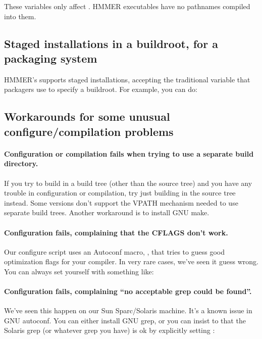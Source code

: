 These variables only affect . HMMER executables
have no pathnames compiled into them.

\subsection{Staged installations in a buildroot, for a packaging system}

HMMER's  supports staged installations, accepting
the traditional  variable that packagers use to specify
a buildroot. For example, you can do:






\subsection{Workarounds for some unusual configure/compilation problems}

\paragraph{Configuration or compilation fails when trying to use a
  separate build directory.}  If you try to build in a build tree
(other than the source tree) and you have any trouble in configuration
or compilation, try just building in the source tree instead. Some
 versions don't support the VPATH mechanism needed to use
separate build trees. Another workaround is to install GNU make.

\paragraph{Configuration fails, complaining that the CFLAGS don't
  work.} Our configure script uses an Autoconf macro,
  , that tries to guess good optimization flags
  for your compiler. In very rare cases, we've seen it guess wrong.
  You can always set  yourself with something like:


\paragraph{Configuration fails, complaining ``no acceptable grep could
  be found''.} We've seen this happen on our Sun Sparc/Solaris
machine. It's a known issue in GNU autoconf. You can either install
GNU grep, or you can insist to  that the Solaris
grep (or whatever grep you have) is ok by explicitly setting
:

